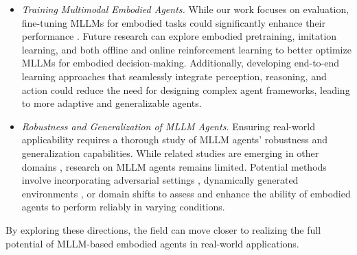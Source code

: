 \begin{itemize}
   \item  \emph{Training Multimodal Embodied Agents.}
   While our work focuses on evaluation, fine-tuning MLLMs for embodied tasks could significantly enhance their performance \cite{mu2024embodiedgpt,szot2024multimodal,zawalski2024robotic}. Future research can explore embodied pretraining, imitation learning, and both offline and online reinforcement learning \cite{sun2023reinforcement} to better optimize MLLMs for embodied decision-making. Additionally, developing end-to-end learning approaches that seamlessly integrate perception, reasoning, and action could reduce the need for designing complex agent frameworks, leading to more adaptive and generalizable agents.
   
    \item \emph{Robustness and Generalization of MLLM Agents.} Ensuring real-world applicability requires a thorough study of MLLM agents' robustness and generalization capabilities. While related studies are emerging in other domains \cite{zou2024dynamath,xu2024robust,yang2023towards,yang2024regularizing,zhang2024out}, research on MLLM agents remains limited. Potential methods involve incorporating adversarial settings \cite{liu2024exploring,wu2024dissecting}, dynamically generated environments \cite{wang2023robogen}, or domain shifts \cite{chattopadhyay2021robustnav} to assess and enhance the ability of embodied agents to perform reliably in varying conditions.
\end{itemize}
By exploring these directions, the field can move closer to realizing the full potential of MLLM-based embodied agents in real-world applications.








